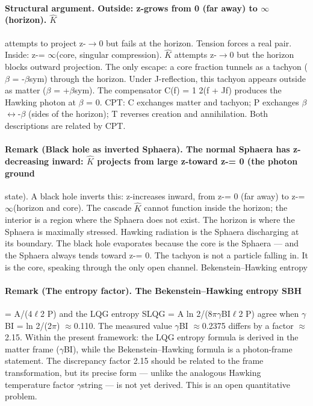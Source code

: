 \documentclass[12pt,a4paper]{article}
\begin{document}
\paragraph*{Structural argument. Outside: z-grows from 0 (far away) to $\infty$(horizon). $\hat K$}
attempts to project z-$\to$0 but fails at the horizon. Tension forces a real pair. Inside: z-= $\infty$(core, singular compression). $\hat K$ attempts z-$\to$0 but the horizon blocks outward projection. The only escape: a core fraction tunnels as a tachyon ($\beta$ = -$\beta$sym) through the horizon. Under J-reflection, this tachyon appears outside as matter ($\beta$ = +$\beta$sym). The compensator C(f) = 1 2(f + Jf) produces the Hawking photon at $\beta$ = 0. CPT: C exchanges matter and tachyon; P exchanges $\beta$ $\leftrightarrow$-$\beta$ (sides of the horizon); T reverses creation and annihilation. Both descriptions are related by CPT.
\paragraph*{Remark (Black hole as inverted Sphaera). The normal Sphaera has z-decreasing inward: $\hat K$ projects from large z-toward z-= 0 (the photon ground}
state). A black hole inverts this: z-increases inward, from z-= 0 (far away) to z-= $\infty$(horizon and core). The cascade $\hat K$ cannot function inside the horizon; the interior is a region where the Sphaera does not exist. The horizon is where the Sphaera is maximally stressed. Hawking radiation is the Sphaera discharging at its boundary. The black hole evaporates because the core is the Sphaera --- and the Sphaera always tends toward z-= 0. The tachyon is not a particle falling in. It is the core, speaking through the only open channel. Bekenstein--Hawking entropy
\paragraph*{Remark (The entropy factor). The Bekenstein--Hawking entropy SBH}
= A/(4$\ell$2 P) and the LQG entropy SLQG = A ln 2/(8$\pi$$\gamma$BI$\ell$2 P) agree when $\gamma$BI = ln 2/(2$\pi$) $\approx$0.110. The measured value $\gamma$BI $\approx$0.2375 differs by a factor $\approx$2.15. Within the present framework: the LQG entropy formula is derived in the matter frame ($\gamma$BI), while the Bekenstein--Hawking formula is a photon-frame statement. The discrepancy factor 2.15 should be related to the frame transformation, but its precise form --- unlike the analogous Hawking temperature factor $\gamma$string --- is not yet derived. This is an open quantitative problem.
\end{document}
